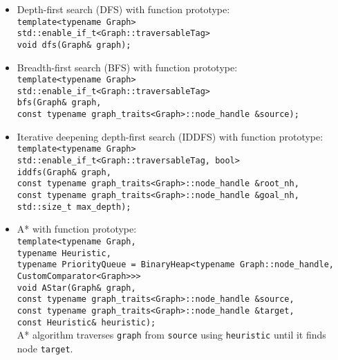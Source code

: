 \documentclass{article}
\begin{document}
\begin{itemize}
	\item Depth-first search (DFS) with function prototype:\\
		\texttt{template<typename Graph>\\
		std::enable\_if\_t<Graph::traversableTag>\\
		void dfs(Graph\& graph);}
	\item Breadth-first search (BFS) with function prototype:\\
		\texttt{template<typename Graph>\\
		std::enable\_if\_t<Graph::traversableTag>\\
		bfs(Graph\& graph,\\\hspace*{2em}
		const typename graph\_traits<Graph>::node\_handle
				 \&source);}
	\item Iterative deepening depth-first search (IDDFS) with function prototype:\\
		\texttt{template<typename Graph>\\
		std::enable\_if\_t<Graph::traversableTag, bool>\\
		iddfs(Graph\& graph,\\\hspace*{3em}
		const typename graph\_traits<Graph>::node\_handle \&root\_nh,\\\hspace*{3em}
		const typename graph\_traits<Graph>::node\_handle \&goal\_nh,\\\hspace*{3em}
	std::size\_t max\_depth);}
	\item A* with function prototype:\\
		\texttt{template<typename Graph,\\\hspace*{4.75em}typename
			Heuristic,\\\hspace*{4.75em}
			typename PriorityQueue = BinaryHeap<typename Graph::node\_handle,\\\hspace*{21.4em}
			CustomComparator<Graph>>>\\
			void AStar(Graph\& graph,\\\hspace*{5.27em}
			const typename graph\_traits<Graph>::node\_handle \&source,\\\hspace*{5.27em}
			const typename graph\_traits<Graph>::node\_handle \&target,\\\hspace*{5.27em}
			const Heuristic\& heuristic);}\\
		A* algorithm traverses \texttt{graph} from \texttt{source} using \texttt{heuristic} until it finds node \texttt{target}.
\end{itemize}
\end{document}
